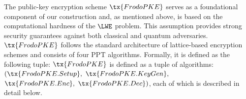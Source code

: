 \documentclass{fundam}
\begin{document}
The public-key encryption scheme $\tx{FrodoPKE}$ serves as a foundational component of our construction and, as mentioned above, is based on the computational hardness of the $\LWE$ problem. This assumption provides strong security guarantees against both classical and quantum adversaries. $\tx{FrodoPKE}$ follows the standard architecture of lattice-based encryption schemes and consists of four PPT algorithms. Formally, it is defined as the following tuple: $\tx{FrodoPKE}$ is defined as a tuple of algorithms: $(\tx{FrodoPKE.Setup},\ \tx{FrodoPKE.KeyGen},$ $\tx{FrodoPKE.Enc},\ \tx{FrodoPKE.Dec})$,
each of which is described in detail below.


\vspace{0.5cm}
 \begin{pchstack}[center]
	
	\begin{pcvstack}
		
		
		\pcvspace
		
		
		
	\end{pcvstack}
	
	\pchspace
	
	\begin{pcvstack}
		~~~~~
     \end{pcvstack}	
		
	\pchspace	
	
	\begin{pcvstack}
	
	
	\pcvspace  
	
\end{pcvstack}	
\end{pchstack}	
\end{document}
